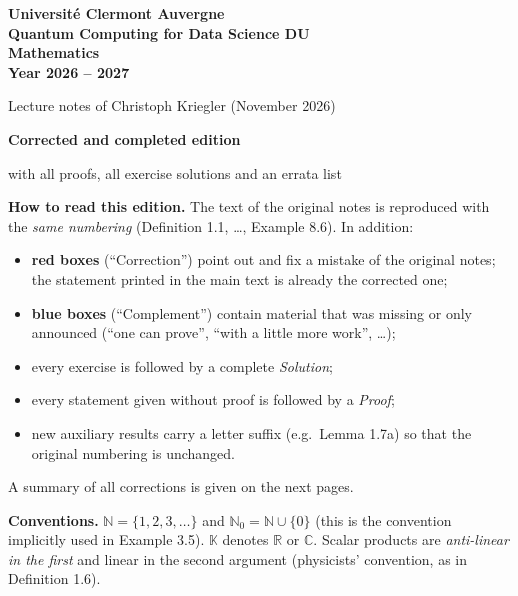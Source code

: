 \documentclass[11pt,a4paper]{article}
\numberwithin{equation}{section}
\newcommand{\N}{\mathbb{N}}
\newcommand{\R}{\mathbb{R}}
\newcommand{\C}{\mathbb{C}}
\newcommand{\K}{\mathbb{K}}
\theoremstyle{plain}
\theoremstyle{definition}
\theoremstyle{plain}
\theoremstyle{definition}
\begin{document}
\begin{titlepage}
\centering
\vspace*{3cm}
{\Large\bfseries Universit\'e Clermont Auvergne\\[2pt]
Quantum Computing for Data Science DU\\[2pt] Mathematics\\[2pt] Year 2026 -- 2027\par}
\vspace{1cm}
{\large Lecture notes of Christoph Kriegler (November 2026)\par}
\vspace{0.6cm}
{\large\bfseries Corrected and completed edition\par}
\vspace{0.3cm}
{\normalsize with all proofs, all exercise solutions and an errata list\par}
\vfill
\begin{minipage}{0.85\textwidth}\small
\textbf{How to read this edition.} The text of the original notes is reproduced with
the \emph{same numbering} (Definition 1.1, \dots, Example 8.6). In addition:
\begin{itemize}[leftmargin=1.5em]
\item \textcolor{BrickRed}{\textbf{red boxes}} (``Correction'') point out and fix a
  mistake of the original notes; the statement printed in the main text is already the
  corrected one;
\item \textcolor{NavyBlue}{\textbf{blue boxes}} (``Complement'') contain material that was
  missing or only announced (``one can prove'', ``with a little more work'', \dots);
\item every exercise is followed by a complete \emph{Solution};
\item every statement given without proof is followed by a \emph{Proof};
\item new auxiliary results carry a letter suffix (e.g.\ Lemma 1.7a) so that the
  original numbering is unchanged.
\end{itemize}
A summary of all corrections is given on the next pages.

\medskip
\textbf{Conventions.} $\N=\{1,2,3,\dots\}$ and $\N_0=\N\cup\{0\}$ (this is the convention
implicitly used in Example 3.5). $\K$ denotes $\R$ or $\C$. Scalar products are
\emph{anti-linear in the first} and linear in the second argument (physicists' convention,
as in Definition 1.6).
\end{minipage}
\vspace{1cm}
\end{titlepage}
\end{document}

